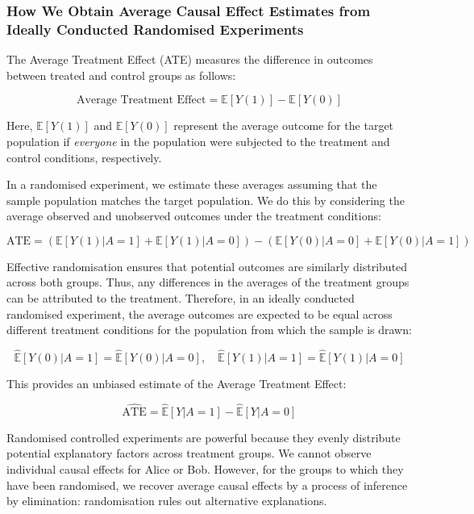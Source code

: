 \documentclass[
  single column]{article}
\begin{document}
\subsubsection{How We Obtain Average Causal Effect Estimates from
Ideally Conducted Randomised
Experiments}\label{how-we-obtain-average-causal-effect-estimates-from-ideally-conducted-randomised-experiments}

The Average Treatment Effect (ATE) measures the difference in outcomes
between treated and control groups as follows:

\[
\text{Average Treatment Effect} = \mathbb{E}[Y(1)] - \mathbb{E}[Y(0)]
\]

Here, \(\mathbb{E}[Y(1)]\) and \(\mathbb{E}[Y(0)]\) represent the
average outcome for the target population if \emph{everyone} in the
population were subjected to the treatment and control conditions,
respectively.

In a randomised experiment, we estimate these averages assuming that the
sample population matches the target population. We do this by
considering the average observed and unobserved outcomes under the
treatment conditions:

\[
\text{ATE} = \left(\mathbb{E}[Y(1) | A = 1] + \mathbb{E}[Y(1) | A = 0]\right) - \left(\mathbb{E}[Y(0) | A = 0] + \mathbb{E}[Y(0) | A = 1]\right)
\]

Effective randomisation ensures that potential outcomes are similarly
distributed across both groups. Thus, any differences in the averages of
the treatment groups can be attributed to the treatment. Therefore, in
an ideally conducted randomised experiment, the average outcomes are
expected to be equal across different treatment conditions for the
population from which the sample is drawn:

\[
\widehat{\mathbb{E}}[Y(0) | A = 1] = \widehat{\mathbb{E}}[Y(0) | A = 0], \quad \widehat{\mathbb{E}}[Y(1) | A = 1] = \widehat{\mathbb{E}}[Y(1) | A = 0]
\]

This provides an unbiased estimate of the Average Treatment Effect:

\[
\widehat{\text{ATE}} = \widehat{\mathbb{E}}[Y | A = 1] - \widehat{\mathbb{E}}[Y | A = 0]
\]

Randomised controlled experiments are powerful because they evenly
distribute potential explanatory factors across treatment groups. We
cannot observe individual causal effects for Alice or Bob. However, for
the groups to which they have been randomised, we recover average causal
effects by a process of inference by elimination: randomisation rules
out alternative explanations.
\end{document}
